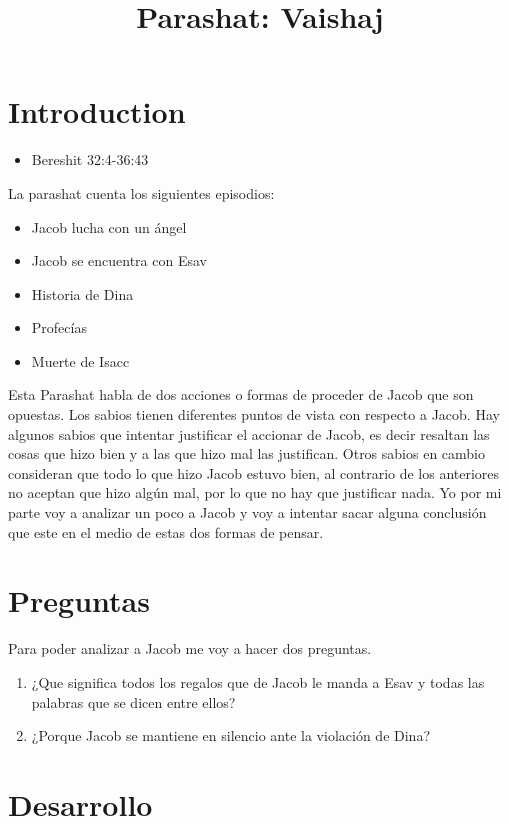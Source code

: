 \documentclass[conference]{IEEEtran}
\title{Parashat: Vaishaj\\ \textit{}}
\author{\IEEEauthorblockN{Kunst, James Jules Waldemar}
\IEEEauthorblockA{Bet-Melej Haba}}
\begin{document}
\maketitle


\section{Introduction}
\begin{itemize}
\item
Bereshit 32:4-36:43
\end{itemize}

La parashat cuenta los siguientes episodios:
\begin{itemize}
\item
Jacob lucha con un ángel
\item
Jacob se encuentra con Esav
\item
Historia de Dina
\item
Profecías
\item
Muerte de Isacc
\end{itemize}

Esta Parashat habla de dos acciones o formas de proceder de Jacob que son opuestas.
Los sabios tienen diferentes puntos de vista con respecto a Jacob.
Hay algunos sabios que intentar justificar el accionar de Jacob, es decir resaltan las cosas que hizo bien y a las que hizo mal las justifican. Otros sabios en cambio consideran que todo lo que hizo Jacob estuvo bien, al contrario de los anteriores no aceptan que hizo algún mal, por lo que no hay que justificar nada.
Yo por mi parte voy a analizar un poco a Jacob y voy a intentar sacar alguna conclusión que este en el medio de estas dos formas de pensar.



\section{Preguntas}
Para poder analizar a Jacob me voy a hacer dos preguntas.
\begin{enumerate}
\item ¿Que significa todos los regalos que de Jacob le manda a Esav y todas las palabras que se dicen entre ellos?
\item ¿Porque Jacob se mantiene en silencio ante la violación de Dina?
\end{enumerate}



\section{Desarrollo}
\end{document}
